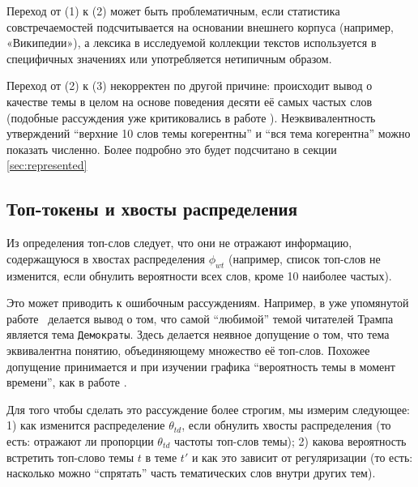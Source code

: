 Переход от (1) к (2) может быть проблематичным, если статистика совстречаемостей подсчитывается на основании внешнего корпуса (например, «Википедии»), а лексика в исследуемой коллекции текстов используется в специфичных значениях или употребляется нетипичным образом.

Переход от (2) к (3) некорректен по другой причине: происходит вывод о качестве темы в целом на основе поведения десяти её самых частых слов (подобные рассуждения уже критиковались в работе  \cite{dh_sea}). Неэквивалентность утверждений ``верхние 10 слов темы когерентны'' и ``вся тема когерентна'' можно показать численно. Более подробно это будет подсчитано в секции \ref{sec:represented}


\subsection{Топ-токены и хвосты распределения}


Из определения топ-слов следует, что они не отражают информацию, содержащуюся в хвостах распределения $\phi_{wt}$ (например, список топ-слов не изменится, если обнулить вероятности всех слов, кроме 10 наиболее частых).

Это может приводить к ошибочным рассуждениям. Например, в уже упомянутой работе~\cite{wang2016catching} делается вывод о том, что самой ``любимой'' темой читателей Трампа является тема \texttt{Демократы}. Здесь делается неявное допущение о том, что тема эквивалентна понятию, объединяющему множество её топ-слов. Похожее допущение принимается и при изучении графика ``вероятность темы в момент времени'', как в работе \cite{monsters_men, dispatch}.

Для того чтобы сделать это рассуждение более строгим, мы измерим следующее: 1) как изменится распределение $\theta_{td}$, если обнулить хвосты распределения (то есть: отражают ли пропорции $\theta_{td}$ частоты топ-слов темы); 2) какова вероятность встретить топ-слово темы $t$ в теме $t'$ и как это зависит от регуляризации (то есть: насколько можно ``спрятать'' часть тематических слов внутри других тем).

